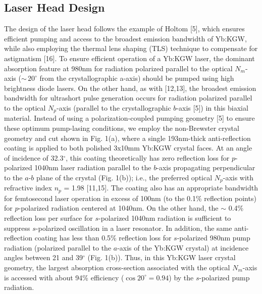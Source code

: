 \subsection{Laser Head Design}

The design of the laser head follows the example of Holtom [5], which ensures efficient pumping and access to the broadest emission bandwidth of Yb:KGW, while also employing the thermal lens shaping (TLS) technique to compensate for astigmatism [16].
To ensure efficient operation of a Yb:KGW laser, the dominant absorption feature at 980nm for radiation polarized parallel to the optical $N_m$-axis ($\sim\,20^\circ$ from the crystallographic a-axis) should be pumped using high brightness diode lasers.
On the other hand, as with  [12,13], the broadest emission bandwidth for ultrashort pulse generation occurs for radiation polarized parallel to the optical $N_p$-axis (parallel to the crystallographic $b$-axis [5]) in this biaxial material. 
Instead of using a polarization-coupled pumping geometry [5] to ensure these optimum pump-lasing conditions, we employ the non-Brewster crystal geometry and cut shown in Fig. 1(a), where a single 193nm-thick  anti-reflection coating is applied to both polished 3x10mm Yb:KGW crystal faces.
At an angle of incidence of 32.3$^\circ$, this coating theoretically has zero reflection loss for $p$-polarized 1040nm laser radiation parallel to the $b$-axis propagating perpendicular to the $a$-$b$ plane of the crystal (Fig. 1(b)); i.e., the preferred optical $N_p$-axis with refractive index $n_p$ = 1.98 [11,15].
The  coating also has an appropriate bandwidth for femtosecond laser operation in excess of 100nm (to the
0.1\% reflection points) for $p$-polarized radiation centered at 1040nm.
On the other hand, the $\sim$ 0.4\% reflection loss per surface for $s$-polarized 1040nm radiation is sufficient to suppress $s$-polarized oscillation in a laser resonator.
In addition, the same anti-reflection coating has less than 0.5\% reflection loss for $s$-polarized 980nm pump radiation (polarized parallel to the $a$-axis of the Yb:KGW crystal) at incidence angles between 21 and 39$^\circ$ (Fig. 1(b)).
Thus, in this Yb:KGW laser crystal geometry, the largest absorption cross-section associated with the optical $N_m$-axis is accessed with about 94\% efficiency ($\cos 20^\circ = 0.94$) by the $s$-polarized pump radiation.


